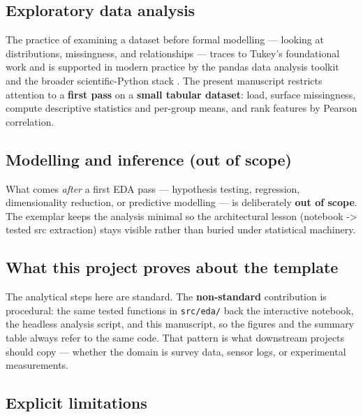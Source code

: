 \documentclass[
  english,
]{article}
\begin{document}
\subsection{Exploratory data analysis}\label{exploratory-data-analysis}

The practice of examining a dataset before formal modelling --- looking
at distributions, missingness, and relationships --- traces to Tukey's
foundational work \citep{tukey1977eda} and is supported in modern
practice by the pandas data analysis toolkit \citep{mckinney2010pandas}
and the broader scientific-Python stack \citep{harris2020numpy}. The
present manuscript restricts attention to a \textbf{first pass} on a
\textbf{small tabular dataset}: load, surface missingness, compute
descriptive statistics and per-group means, and rank features by Pearson
correlation.

\subsection{Modelling and inference (out of
scope)}\label{modelling-and-inference-out-of-scope}

What comes \emph{after} a first EDA pass --- hypothesis testing,
regression, dimensionality reduction, or predictive modelling --- is
deliberately \textbf{out of scope}. The exemplar keeps the analysis
minimal so the architectural lesson (notebook -\textgreater{} tested src
extraction) stays visible rather than buried under statistical
machinery.

\subsection{What this project proves about the
template}\label{what-this-project-proves-about-the-template}

The analytical steps here are standard. The \textbf{non-standard}
contribution is procedural: the same tested functions in
\texttt{src/eda/} back the interactive notebook, the headless analysis
script, and this manuscript, so the figures and the summary table always
refer to the same code. That pattern is what downstream projects should
copy --- whether the domain is survey data, sensor logs, or experimental
measurements.

\subsection{Explicit limitations}\label{explicit-limitations}
\end{document}
